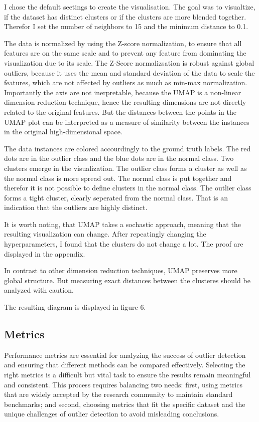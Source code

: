 I chose the default seetings to create the visualisation. 
The goal was to visualtize, if the dataset has distinct clusters or if the clusters are more blended together.
Therefor I set the number of neighbors to 15 and the minimum distance to 0.1.


The data is normalized by using the Z-score normalization, to ensure that all features are on the same scale and to prevent any feature from dominating the visualization due to its scale.
The Z-Score normalizsation is robust against global outliers, because it uses the mean and standard deviation of the data to scale the features, which are not affected by outliers as much as min-max normalization.
Importantly the axis are not inerpretable, because the UMAP is a non-linear dimension reduction technique, hence the resulting dimensions are not directly related to the original features.
But the distances between the points in the UMAP plot can be interpreted as a measure of similarity between the instances in the original high-dimensional space.


The data instances are colored accourdingly to the ground truth labels.
The red dots are in the outlier class and the blue dots are in the normal class.
Two clusters emerge in the visualization.
The outlier class forms a cluster as well as the normal class is more spread out.
The normal class is put together and therefor it is not possible to define clusters in the normal class.
The outlier class forms a tight cluster, clearly seperated from the normal class.
That is an indication that the outliers are highly distinct.

It is worth noting, that UMAP takes a sochastic approach, meaning that the resulting visualization can change.
After repeatingly changing the hyperparameters, I found that the clusters do not change a lot.
The proof are displayed in the appendix.


In contrast to other dimension reduction techniques, UMAP preserves more global structure.
But measuring exact distances between the clusteres should be analyzed with caution. 


The resulting diagram is displayed in figure 6.



\subsection{Metrics}
Performance metrics are essential for analyzing the success of outlier detection and ensuring that different methods can be compared effectively. 
Selecting the right metrics is a difficult but vital task to ensure the results remain meaningful and consistent. 
This process requires balancing two needs: first, using metrics that are widely accepted by the research community to maintain standard benchmarks; and second, choosing metrics that fit the specific dataset and the unique challenges of outlier detection to avoid misleading conclusions.


